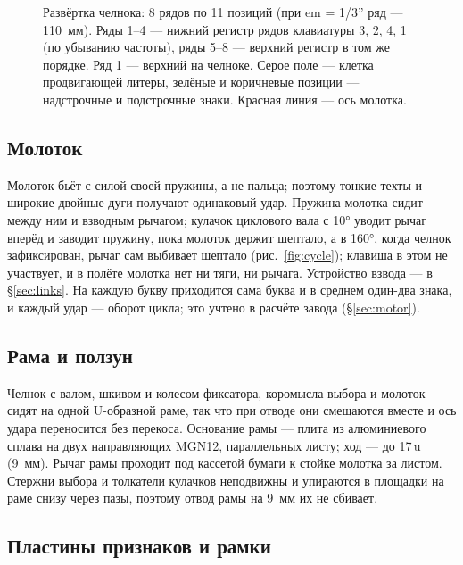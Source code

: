 \begin{figure}[h]
\centering
\setlength\tgem{9.5mm}
\begin{tikzpicture}[x=\tgu,y=\tgu]

\end{tikzpicture}
\caption{Развёртка челнока: 8 рядов по 11 позиций (при em = 1/3'' ряд — 110~мм). Ряды 1--4 — нижний регистр рядов клавиатуры 3, 2, 4, 1 (по убыванию частоты), ряды 5--8 — верхний регистр в том же порядке. Ряд 1 — верхний на челноке. Серое поле — клетка продвигающей литеры, зелёные и коричневые позиции — надстрочные и подстрочные знаки. Красная линия — ось молотка.}
\label{fig:shuttle}
\end{figure}

\subsection{Молоток}

Молоток бьёт с силой своей пружины, а не пальца; поэтому тонкие техты и широкие двойные дуги получают одинаковый удар. Пружина молотка сидит между ним и взводным рычагом; кулачок циклового вала с 10° уводит рычаг вперёд и заводит пружину, пока молоток держит шептало, а в 160°, когда челнок зафиксирован, рычаг сам выбивает шептало (рис.~\ref{fig:cycle}); клавиша в этом не участвует, и в полёте молотка нет ни тяги, ни рычага. Устройство взвода — в \S\ref{sec:links}. На каждую букву приходится сама буква и в среднем один-два знака, и каждый удар — оборот цикла; это учтено в расчёте завода (\S\ref{sec:motor}).

\subsection{Рама и ползун}

Челнок с валом, шкивом и колесом фиксатора, коромысла выбора и молоток сидят на одной U-образной раме, так что при отводе они смещаются вместе и ось удара переносится без перекоса. Основание рамы — плита из алюминиевого сплава на двух направляющих MGN12, параллельных листу; ход — до 17\,u (9~мм). Рычаг рамы проходит под кассетой бумаги к стойке молотка за листом. Стержни выбора и толкатели кулачков неподвижны и упираются в площадки на раме снизу через пазы, поэтому отвод рамы на 9~мм их не сбивает.

\subsection{Пластины признаков и рамки}\label{sec:plates}

